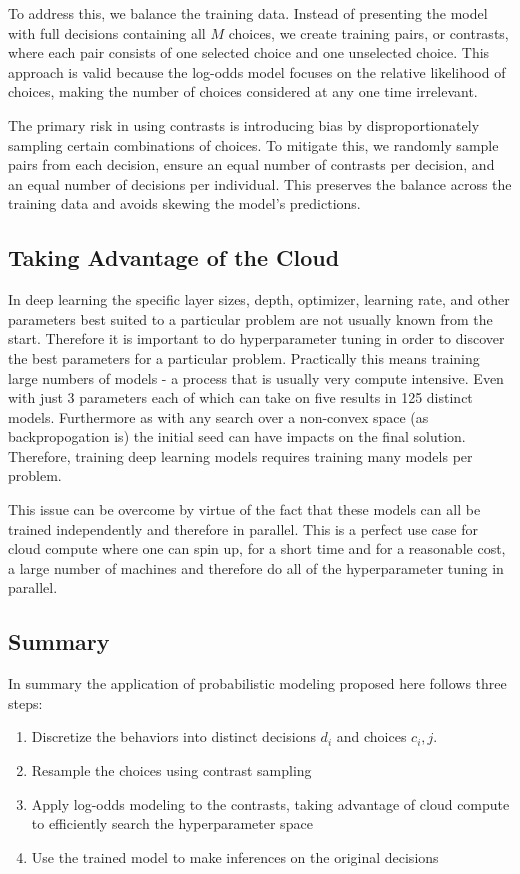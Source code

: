 \documentclass[11pt]{article}
\begin{document}
To address this, we balance the training data. Instead of presenting the model with full decisions containing all $M$ choices, we create training pairs, or contrasts, where each pair consists of one selected choice and one unselected choice. This approach is valid because the log-odds model focuses on the relative likelihood of choices, making the number of choices considered at any one time irrelevant.

The primary risk in using contrasts is introducing bias by disproportionately sampling certain combinations of choices. To mitigate this, we randomly sample pairs from each decision, ensure an equal number of contrasts per decision, and an equal number of decisions per individual. This preserves the balance across the training data and avoids skewing the model's predictions.

\subsection*{Taking Advantage of the Cloud}

In deep learning the specific layer sizes, depth, optimizer, learning rate, and other parameters best suited to a particular problem are not usually known from the start. Therefore it is important to do hyperparameter tuning in order to discover the best parameters for a particular problem. Practically this means training large numbers of models - a process that is usually very compute intensive. Even with just 3 parameters each of which can take on five results in 125 distinct models. Furthermore as with any search over a non-convex space (as backpropogation is) the initial seed can have impacts on the final solution. Therefore, training deep learning models requires training many models per problem.

This issue can be overcome by virtue of the fact that these models can all be trained independently and therefore in parallel. This is a perfect use case for cloud compute where one can spin up, for a short time and for a reasonable cost, a large number of machines and therefore do all of the hyperparameter tuning in parallel. 

\subsection*{Summary}

In summary the application of probabilistic modeling proposed here follows three steps:

\begin{enumerate}
\item Discretize the behaviors into distinct decisions $d_i$ and choices $c_i,j$. 
\item Resample the choices using contrast sampling
\item Apply log-odds modeling to the contrasts, taking advantage of cloud compute to efficiently search the hyperparameter space
\item Use the trained model to make inferences on the original decisions
\end{enumerate}
\end{document}
